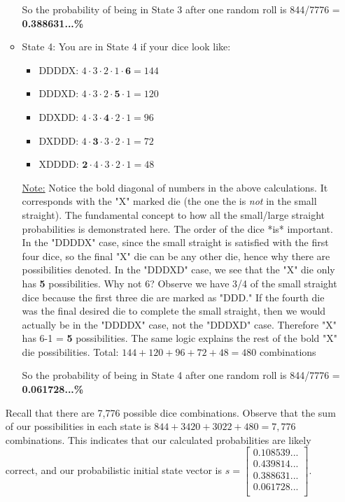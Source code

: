 \documentclass[12pt,a4paper]{article}
\begin{document}
\begin{itemize}
\begin{itemize}
    So the probability of being in State 3 after one random roll is 844/7776 = \textbf{0.388631...\%}
    \item State 4: You are in State 4 if your dice look like:
    \begin{itemize}
        \item DDDDX: $4 \cdot 3 \cdot 2 \cdot 1 \cdot \textbf{6} = 144$
        \item DDDXD: $4 \cdot 3 \cdot 2 \cdot \textbf{5} \cdot 1 = 120$
        \item DDXDD: $4 \cdot 3 \cdot \textbf{4} \cdot 2 \cdot 1 = 96$
        \item DXDDD: $4 \cdot \textbf{3} \cdot 3 \cdot 2 \cdot 1 = 72$
        \item XDDDD: $\textbf{2} \cdot 4 \cdot 3 \cdot 2 \cdot 1 = 48$
    \end{itemize}
    \underline{Note:} Notice the bold diagonal of numbers in the above calculations. It corresponds with the "X" marked die (the one the is \textit{not} in the small straight). The fundamental concept to how all the small/large straight probabilities is demonstrated here. The order of the dice *is* important. In the "DDDDX" case, since the small straight is satisfied with the first four dice, so the final "X" die can be any other die, hence why there are  possibilities denoted. In the "DDDXD" case, we see that the "X" die only has \textbf{5} possibilities. Why not 6? Observe we have 3/4 of the small straight dice because the first three die are marked as "DDD." If the fourth die was the final desired die to complete the small straight, then we would actually be in the "DDDDX" case, not the "DDDXD" case. Therefore "X" has 6-1 = \textbf{5} possibilities. The same logic explains the rest of the bold "X" die possibilities.
    Total: $144 + 120 + 96 + 72 + 48 = 480$ combinations

    So the probability of being in State 4 after one random roll is 844/7776 = \textbf{0.061728...\%}
    \end{itemize}
    Recall that there are 7,776 possible dice combinations. Observe that the sum of our possibilities in each state is $844 + 3420 + 3022 + 480 = 7,776$ combinations. This indicates that our calculated probabilities are likely correct, and our probabilistic initial state vector is
    $s = \begin{bmatrix}
0.108539... \\
0.439814... \\
0.388631... \\
0.061728... \\
\end{bmatrix}$.


\end{itemize}
\end{document}
